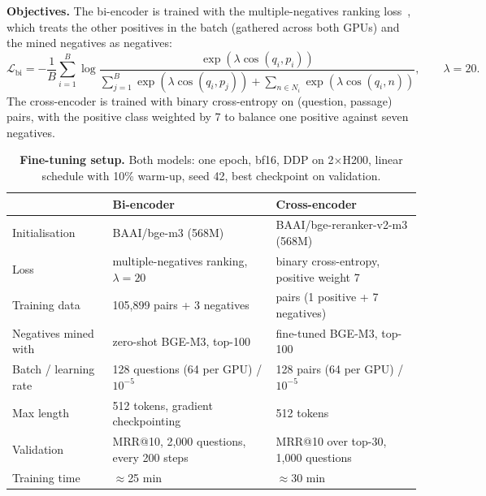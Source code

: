 \documentclass{article} %
\begin{document}
\textbf{Objectives.} The bi-encoder is trained with the multiple-negatives ranking loss~\citep{henderson2017mnrl}, which
treats the other positives in the batch (gathered across both GPUs) and the mined negatives as negatives:
\[
\mathcal{L}_{\mathrm{bi}} = -\frac{1}{B}\sum_{i=1}^{B} \log
\frac{\exp\left(\lambda \cos(q_i, p_i)\right)}{\sum_{j=1}^{B} \exp\left(\lambda \cos(q_i, p_j)\right) + \sum_{n \in N_i} \exp\left(\lambda \cos(q_i, n)\right)},
\qquad \lambda = 20 .
\]
The cross-encoder is trained with binary cross-entropy on (question, passage) pairs, with the positive class weighted by
7 to balance one positive against seven negatives.

\begin{table}[t]
\centering
\caption{\textbf{Fine-tuning setup.} Both models: one epoch, bf16, DDP on 2$\times$H200, linear schedule with 10\% warm-up,
seed 42, best checkpoint on validation.}
\label{tab:train}
\small
\begin{tabular}{lll}
\toprule
& \textbf{Bi-encoder} & \textbf{Cross-encoder} \\
\midrule
Initialisation & BAAI/bge-m3 (568M) & BAAI/bge-reranker-v2-m3 (568M) \\
Loss & multiple-negatives ranking, $\lambda = 20$ & binary cross-entropy, positive weight 7 \\
Training data & 105,899 pairs + 3 negatives & \ResCePairs{} pairs (1 positive + 7 negatives) \\
Negatives mined with & zero-shot BGE-M3, top-100 & fine-tuned BGE-M3, top-100 \\
Batch / learning rate & 128 questions (64 per GPU) / $10^{-5}$ & 128 pairs (64 per GPU) / $10^{-5}$ \\
Max length & 512 tokens, gradient checkpointing & 512 tokens \\
Validation & MRR@10, 2,000 questions, every 200 steps & MRR@10 over top-30, 1,000 questions \\
Training time & $\approx$25 min & $\approx$30 min \\
\bottomrule
\end{tabular}
\end{table}
\end{document}
